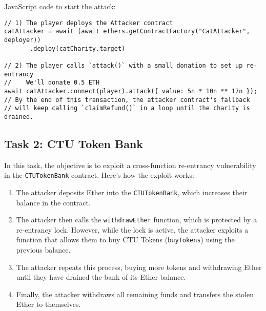 \documentclass[12pt]{article}
\begin{document}
\noindent
JavaScript code to start the attack:
\begin{verbatim}
// 1) The player deploys the Attacker contract
catAttacker = await (await ethers.getContractFactory("CatAttacker", deployer))
       .deploy(catCharity.target)

// 2) The player calls `attack()` with a small donation to set up re-entrancy
//    We'll donate 0.5 ETH
await catAttacker.connect(player).attack({ value: 5n * 10n ** 17n });
// By the end of this transaction, the attacker contract's fallback
// will keep calling `claimRefund()` in a loop until the charity is drained.
\end{verbatim}

\subsection*{Task 2: CTU Token Bank}

In this task, the objective is to exploit a cross-function re-entrancy vulnerability in the \texttt{CTUTokenBank} contract. Here's how the exploit works:
\begin{enumerate}
    \item The attacker deposits Ether into the \texttt{CTUTokenBank}, which increases their balance in the contract.
    \item The attacker then calls the \texttt{withdrawEther} function, which is protected by a re-entrancy lock. However, while the lock is active, the attacker exploits a function that allows them to buy CTU Tokens (\texttt{buyTokens}) using the previous balance.
    \item The attacker repeats this process, buying more tokens and withdrawing Ether until they have drained the bank of its Ether balance.
    \item Finally, the attacker withdraws all remaining funds and transfers the stolen Ether to themselves.
\end{enumerate}
\end{document}
